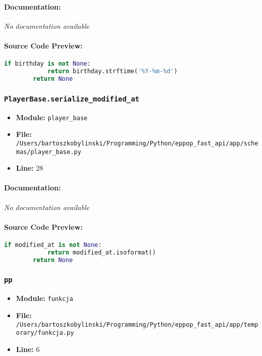 \documentclass[11pt,a4paper]{article}
\begin{document}
\paragraph{Documentation:} \textit{No documentation available}

\paragraph{Source Code Preview:}
\begin{lstlisting}[language=Python]
        if birthday is not None:
            return birthday.strftime('%Y-%m-%d')
        return None
\end{lstlisting}

\vspace{1em}
\subsubsection{\texttt{PlayerBase.serialize\_modified\_at}}

\begin{itemize}
    \item \textbf{Module:} \texttt{player\_base}
    \item \textbf{File:} \texttt{/Users/bartoszkobylinski/Programming/Python/eppop\_fast\_api/app/schemas/player\_base.py}
    \item \textbf{Line:} 28
\end{itemize}

\paragraph{Documentation:} \textit{No documentation available}

\paragraph{Source Code Preview:}
\begin{lstlisting}[language=Python]
        if modified_at is not None:
            return modified_at.isoformat()
        return None
\end{lstlisting}

\vspace{1em}
\subsubsection{\texttt{pp}}

\begin{itemize}
    \item \textbf{Module:} \texttt{funkcja}
    \item \textbf{File:} \texttt{/Users/bartoszkobylinski/Programming/Python/eppop\_fast\_api/app/temporary/funkcja.py}
    \item \textbf{Line:} 6
\end{itemize}
\end{document}
